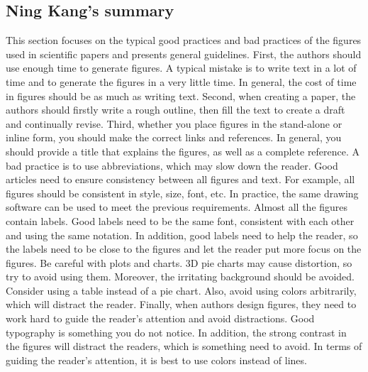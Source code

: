 \documentclass[paper=a4, fontsize=11pt]{scrartcl} %
\numberwithin{equation}{section} %
\numberwithin{figure}{section} %
\numberwithin{table}{section} %
\begin{document}
	\subsection{Ning Kang's summary}
		This section focuses on the typical good practices and bad practices of the figures used in scientific papers and presents general guidelines. \newline
		First, the authors should use enough time to generate figures. A typical mistake is to write text in a lot of time and to generate the figures in a very little time. In general, the cost of time in figures should be as much as writing text.\newline
		Second, when creating a paper, the authors should firstly write a rough outline, then fill the text to create a draft and continually revise.  \newline
		Third, whether you place figures in the stand-alone or inline form, you should make the correct links and references. In general, you should provide a title that explains the figures, as well as a complete reference. A bad practice is to use abbreviations, which may slow down the reader.\newline
		Good articles need to ensure consistency between all figures and text. For example, all figures should be consistent in style, size, font, etc. In practice, the same drawing software can be used to meet the previous requirements. \newline
		Almost all the figures contain labels. Good labels need to be the same font, consistent with each other and using the same notation. In addition, good labels need to help the reader, so the labels need to be close to the figures and let the reader put more focus on the figures. \newline
		Be careful with plots and charts. 3D pie charts may cause distortion, so try to avoid using them. Moreover, the irritating background should be avoided. Consider using a table instead of a pie chart. Also, avoid using colors arbitrarily, which will distract the reader. \newline
		Finally, when authors design figures, they need to work hard to guide the reader's attention and avoid distractions. Good typography is something you do not notice. In addition, the strong contrast in the figures will distract the readers, which is something need to avoid. In terms of guiding the reader's attention, it is best to use colors instead of lines.
		
\end{document}
